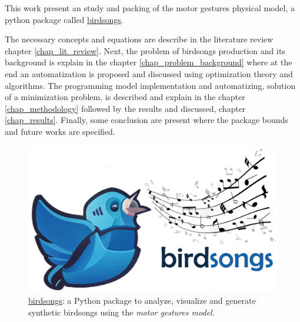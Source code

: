 This work present an study and packing of the motor gestures physical model, a python package called \href{https://github.com/saguileran/birdsongs/}{birdsongs}. \vspace{5pt}

\begin{minipage}{0.6\linewidth}
The necessary concepts and equations are describe in the literature review chapter \ref{chap_lit_review}. Next, the problem of birdsongs production and its background is explain in the chapter \ref{chap_problem_background} where at the end an automatization is proposed and discussed using optimization theory and algorithms. The programming model implementation and automatizing, solution of a minimization problem, is described and explain in the chapter \ref{chap_methodology} followed by the results and discussed, chapter \ref{chap_results}. Finally, some conclusion are present where the package bounds and future works are specified.
\end{minipage}\hfill
\begin{minipage}{0.35\linewidth}
\begin{figure}[H]
    \centering
    \includegraphics[width=\linewidth]{Images/bird_logo.png}
    \caption{\href{https://github.com/saguileran/birdsongs}{birdsongs}: a Python package to analyze, visualize and generate synthetic birdsongs using the\textit{ motor gestures model}. }
    \label{fig:logo}
\end{figure}
\end{minipage}